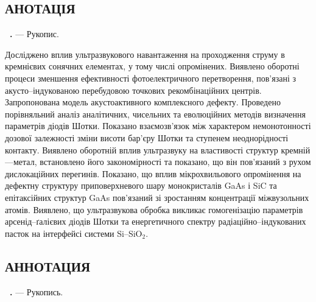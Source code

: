 \begin{center}
\section*{\MakeUppercase{анотація}}
\end{center}
\textbf{\thesisAuthorFIO~\thesisTitle.} --- Рукопис.

\abstractBegin

Досліджено вплив ультразвукового навантаження на проходження струму в кремнієвих сонячних елементах,
 у тому числі опромінених.
 Виявлено оборотні процеси зменшення ефективності фотоелектричного перетворення,
 пов'язані з акусто--індукованою перебудовою точкових рекомбінаційних центрів.
 Запропонована модель акустоактивного комплексного дефекту.
 Проведено порівняльний аналіз аналітичних, чисельних та еволюційних методів визначення параметрів діодів Шотки.
 Показано взаємозв'язок між характером немонотонності дозової залежності зміни висоти бар'єру Шотки та ступенем неоднорідності контакту.
 Виявлено оборотній вплив ультразвуку на властивості структур кремній---метал, встановлено його закономірності
 та показано, що він пов'язаний з рухом дислокаційних перегинів.
 Показано, що вплив мікрохвильового опромінення на дефектну структуру приповерхневого шару монокристалів GaAs і SiC та епітаксійних структур GaAs
 пов'язаний зі зростанням концентрації міжвузольних атомів.
 Виявлено, що ультразвукова обробка викликає гомогенізацію параметрів арсенід--ґалієвих діодів Шотки та енергетичного спектру радіаційно--індукованих пасток  на інтерфейсі системи  Si--SiO$_2$.

\keywords


\begin{center}
{\section*{\MakeUppercase{АННОТАЦИЯ}}}
\end{center}
\textbf{\thesisAuthorFIOru~\thesisTitleRu.} --- Рукопись.

\abstractBeginRu

